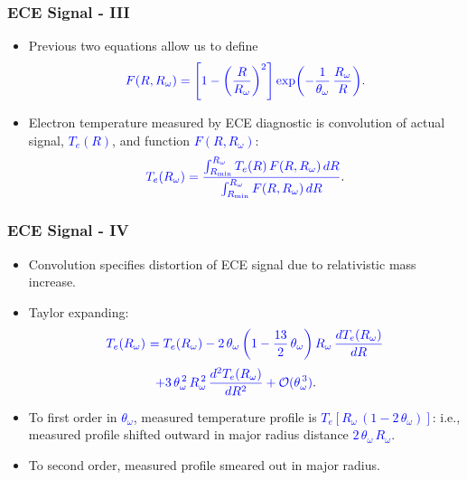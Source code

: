 \documentclass{beamer}
\begin{document}
\begin{frame}
\frametitle{ECE Signal - III}
 
\begin{itemize}
\item Previous two equations allow us to define 
$$
\textcolor{blue}{F(R,R_\omega) = \left[1-\left(\frac{R}{R_\omega}\right)^2\right]\exp\!\left(-\frac{1}{\theta_\omega}\,\frac{R_\omega}{R}\right)}.
$$

\item Electron temperature measured by  ECE diagnostic is  convolution of actual signal, \textcolor{blue}{$T_e(R)$},  and function \textcolor{blue}{$F(R,R_\omega)$}:
$$
\textcolor{blue}{T_e(R_\omega) = \frac{\int_{R_{\rm min}}^{R_\omega} T_e(R)\,F(R,R_\omega)\,dR}  {\int_{R_{\rm min}}^{R_\omega} F(R,R_\omega)\,dR}}.
$$
 \end{itemize}
 \end{frame}
 
 \begin{frame}
\frametitle{ECE Signal - IV}
 
\begin{itemize}
\item Convolution specifies distortion of ECE signal due to relativistic mass increase. 
\item Taylor expanding: 
\begin{align*}
\textcolor{blue}{T_e(R_\omega)}&\textcolor{blue}{~= T_e(R_\omega) - 2\,\theta_\omega\left(1-\frac{13}{2}\,\theta_\omega\right) R_\omega\,\frac{d T_e(R_\omega)}{dR}}\\[0.5ex]
&\phantom{=}\textcolor{blue}{+ 3\,\theta_\omega^{\,2}\,R_\omega^{\,2}\,
\frac{d^2 T_e(R_\omega)}{dR^2} + {\cal O}(\theta_\omega^{\,3})}.
\end{align*}
\item To first order  in \textcolor{blue}{$\theta_\omega$}, 
measured temperature profile is \textcolor{blue}{$T_e[R_\omega\,(1-2\,\theta_\omega)]$}: i.e.,  measured profile shifted outward in major radius 
distance \textcolor{blue}{$2\,\theta_\omega\,R_\omega$}. 
\item To second order,  measured profile  smeared out in major radius. 
\end{itemize}
\end{frame}
\end{document}
